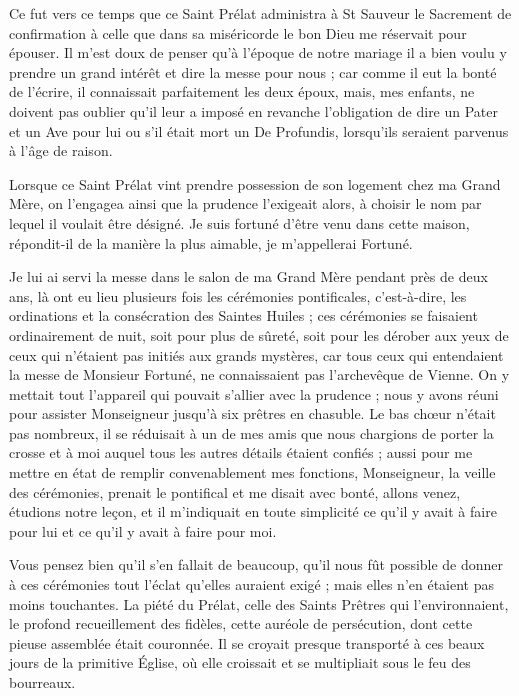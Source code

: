 \documentclass[11pt,a4paper]{report}
\begin{document}
Ce fut vers ce temps que ce Saint Prélat administra à St Sauveur le Sacrement de confirmation à celle que dans sa miséricorde le bon Dieu me réservait pour épouser. Il m'est doux de penser qu'à l'époque de notre mariage il a bien voulu y prendre un grand intérêt et dire la messe pour nous ; car comme il eut la bonté de l'écrire, il connaissait parfaitement les deux époux, mais, mes enfants, ne doivent pas oublier qu'il leur a imposé en revanche l'obligation de dire un Pater et un Ave pour lui ou s'il était mort un De Profundis, lorsqu'ils seraient parvenus à l'âge de raison.

Lorsque ce Saint Prélat vint prendre possession de son logement chez ma Grand Mère, on l'engagea ainsi que la prudence l'exigeait alors, à choisir le nom par lequel il voulait être désigné. Je suis fortuné d'être venu dans cette maison, répondit-il de la manière la plus aimable, je m'appellerai Fortuné.

Je lui ai servi la messe dans le salon de ma Grand Mère pendant près de deux ans, là ont eu lieu plusieurs fois les cérémonies pontificales, c'est-à-dire, les ordinations et la consécration des Saintes Huiles ; ces cérémonies se faisaient ordinairement de nuit, soit pour plus de sûreté, soit pour les dérober aux yeux de ceux qui n'étaient pas initiés aux grands mystères, car tous ceux qui entendaient la messe de Monsieur Fortuné, ne connaissaient pas l'archevêque de Vienne. On y mettait tout l'appareil qui pouvait s'allier avec la prudence ; nous y avons réuni pour assister Monseigneur jusqu'à six prêtres en chasuble. Le bas chœur n'était pas nombreux, il se réduisait à un de mes amis que nous chargions de porter la crosse et à moi auquel tous les autres détails étaient confiés ; aussi pour me mettre en état de remplir convenablement mes fonctions, Monseigneur, la veille des cérémonies, prenait le pontifical et me disait avec bonté, allons venez, étudions notre leçon, et il m'indiquait en toute simplicité ce qu'il y avait à faire pour lui et ce qu'il y avait à faire pour moi.

Vous pensez bien qu'il s'en fallait de beaucoup, qu'il nous fût possible de donner à ces cérémonies tout l'éclat qu'elles auraient exigé ; mais elles n'en étaient pas moins touchantes. La piété du Prélat, celle des Saints Prêtres qui l'environnaient, le profond recueillement des fidèles, cette auréole de persécution, dont cette pieuse assemblée était couronnée. Il se croyait presque transporté à ces beaux jours de la primitive Église, où elle croissait et se multipliait sous le feu des bourreaux.
\end{document}
